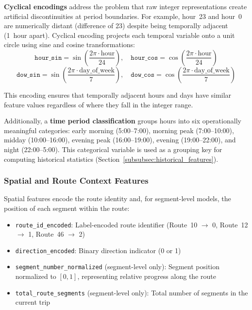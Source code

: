 \textbf{Cyclical encodings} address the problem that raw integer representations create artificial discontinuities at period boundaries. For example, hour~23 and hour~0 are numerically distant (difference of 23) despite being temporally adjacent (1~hour apart). Cyclical encoding projects each temporal variable onto a unit circle using sine and cosine transformations:
\begin{equation}
    \texttt{hour\_sin} = \sin\!\left(\frac{2\pi \cdot \text{hour}}{24}\right), \quad
    \texttt{hour\_cos} = \cos\!\left(\frac{2\pi \cdot \text{hour}}{24}\right)
\end{equation}
\begin{equation}
    \texttt{dow\_sin} = \sin\!\left(\frac{2\pi \cdot \text{day\_of\_week}}{7}\right), \quad
    \texttt{dow\_cos} = \cos\!\left(\frac{2\pi \cdot \text{day\_of\_week}}{7}\right)
\end{equation}

This encoding ensures that temporally adjacent hours and days have similar feature values regardless of where they fall in the integer range.

Additionally, a \textbf{time period classification} groups hours into six operationally meaningful categories: early morning (5:00--7:00), morning peak (7:00--10:00), midday (10:00--16:00), evening peak (16:00--19:00), evening (19:00--22:00), and night (22:00--5:00). This categorical variable is used as a grouping key for computing historical statistics (Section~\ref{subsubsec:historical_features}).

\subsubsection{Spatial and Route Context Features}
\label{subsubsec:spatial_features}

Spatial features encode the route identity and, for segment-level models, the position of each segment within the route:
\begin{itemize}
    \item \texttt{route\_id\_encoded}: Label-encoded route identifier (Route~10 $\rightarrow$ 0, Route~12 $\rightarrow$ 1, Route~46 $\rightarrow$ 2)
    \item \texttt{direction\_encoded}: Binary direction indicator (0 or 1)
    \item \texttt{segment\_number\_normalized} (segment-level only): Segment position normalized to $[0, 1]$, representing relative progress along the route
    \item \texttt{total\_route\_segments} (segment-level only): Total number of segments in the current trip
\end{itemize}

